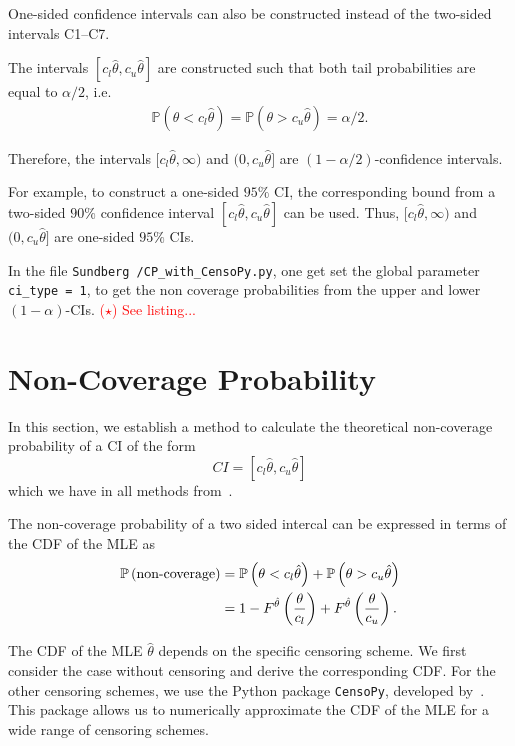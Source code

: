 One-sided confidence intervals can also be constructed instead of the two-sided intervals C1--C7.

The intervals $[c_l \hat{\theta}, c_u \hat{\theta}]$ are constructed such that both tail probabilities are equal to $\alpha/2$, i.e.
\begin{align*}
	\mathbb{P} \left( \theta < c_l \hat{\theta} \right)
	=
	\mathbb{P} \left( \theta > c_u \hat{\theta} \right)
	=
	\alpha / 2.
\end{align*}

Therefore, the intervals $[c_l \hat{\theta}, \infty)$ and $(0, c_u \hat{\theta}]$ are $(1-\alpha/2)$-confidence intervals.

For example, to construct a one-sided $95\%$ CI, the corresponding bound from a two-sided $90\%$ confidence interval $[c_l \hat{\theta}, c_u \hat{\theta}]$ can be used. Thus, $[c_l \hat{\theta}, \infty)$ and $(0, c_u \hat{\theta}]$ are one-sided $95\%$ CIs.

In the file \texttt{Sundberg \slash CP\_with\_CensoPy.py}, one get set the global parameter \texttt{ci\_type = 1}, to get the non coverage probabilities from the upper and lower $(1- \alpha)$-CIs. \textcolor{red}{($\star$) See listing...}


\section{Non-Coverage Probability}


In this section, we establish a method to calculate the theoretical non-coverage probability of a CI of the form
\[
CI = [c_l \hat{\theta}, c_u \hat{\theta}]
\]
which we have in all methods from~\cite{Sundberg2001}.

The non-coverage probability of a two sided intercal can be expressed in terms of the CDF of the MLE as
\begin{align} \label{non cover prob for uncensored}
	\mathbb{P} \left( \text{non-coverage} \right)
	&=
	\mathbb{P} \left( \theta < c_l \hat{\theta} \right)
	+
	\mathbb{P} \left( \theta > c_u \hat{\theta} \right) \notag \\
	&=
	1 - F^{\hat{\theta}} \left( \frac{\theta}{c_l} \right)
	+ F^{\hat{\theta}} \left( \frac{\theta}{c_u} \right).
\end{align}

The CDF of the MLE $\hat{\theta}$ depends on the specific censoring scheme. We first consider the case without censoring and derive the corresponding CDF. For the other censoring schemes, we use the Python package \texttt{CensoPy}, developed by~\cite{Cramer2026a}. This package allows us to numerically approximate the CDF of the MLE for a wide range of censoring schemes.

